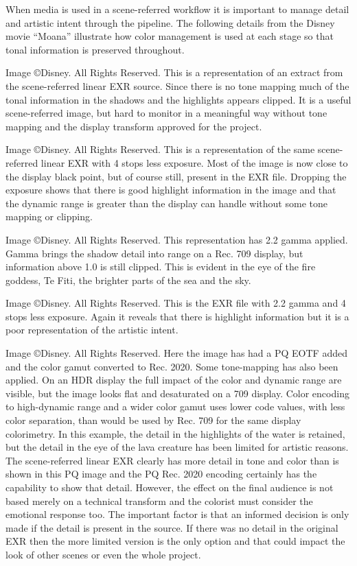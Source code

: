 When media is used in a scene-referred workflow it is important to manage detail and artistic intent through the pipeline. The following details from the Disney movie “Moana” illustrate how color management is used at each stage so that tonal information is preserved throughout.

Image ©Disney. All Rights Reserved.
This is a representation of an extract from the scene-referred linear EXR source. Since there is no tone mapping much of the tonal information in the shadows and the highlights appears clipped. It is a useful scene-referred image, but hard to monitor in a meaningful way without tone mapping and the display transform approved for the project.


Image ©Disney. All Rights Reserved.
This is a representation of the same scene-referred linear EXR with 4 stops less exposure. Most of the image is now close to the display black point, but of course still, present in the EXR file. Dropping the exposure shows that there is good highlight information in the image and that the dynamic range is greater than the display can handle without some tone mapping or clipping.


Image ©Disney. All Rights Reserved.
This representation has 2.2 gamma applied. Gamma brings the shadow detail into range on a Rec. 709 display, but information above 1.0 is still clipped. This is evident in the eye of the fire goddess, Te Fiti, the brighter parts of the sea and the sky.

Image ©Disney. All Rights Reserved.
This is the EXR file with 2.2 gamma and 4 stops less exposure. Again it reveals that there is highlight information but it is a poor representation of the artistic intent.

Image ©Disney. All Rights Reserved.
Here the image has had a PQ EOTF added and the color gamut converted to Rec. 2020. Some tone-mapping has also been applied. On an HDR display the full impact of the color and dynamic range are visible, but the image looks flat and desaturated on a 709 display. Color encoding to high-dynamic range and a wider color gamut uses lower code values, with less color separation, than would be used by Rec. 709 for the same display colorimetry. In this example, the detail in the highlights of the water is retained, but the detail in the eye of the lava creature has been limited for artistic reasons. The scene-referred linear EXR clearly has more detail in tone and color than is shown in this PQ image and the PQ  Rec. 2020 encoding certainly has the capability to show that detail. However, the effect on the final audience is not based merely on a technical transform and the colorist must consider the emotional response too. The important factor is that an informed decision is only made if the detail is present in the source. If there was no detail in the original EXR then the more limited version is the only option and that could impact the look of other scenes or even the whole project.


